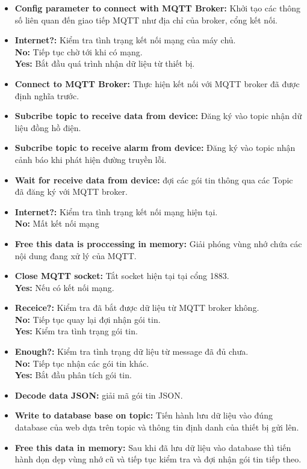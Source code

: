 \begin{itemize}
    \item \textbf{Config parameter to connect with MQTT Broker:} Khởi tạo các thông số liên quan đến giao tiếp MQTT như địa chỉ của broker, cổng kết nối.
    \item \textbf{Internet?:} Kiểm tra tình trạng kết nối mạng của máy chủ.\\
    \textbf{No:} Tiếp tục chờ tới khi có mạng.\\
    \textbf{Yes:} Bắt đầu quá trình nhận dữ liệu từ thiết bị.
    \item \textbf{Connect to MQTT Broker:} Thực hiện kết nối với MQTT broker đã được định nghĩa trước.
    \item \textbf{Subcribe topic to receive data from device:} Đăng ký vào topic nhận dữ liệu đồng hồ điện.
    \item \textbf{Subcribe topic to receive alarm from device:} Đăng ký vào topic nhận cảnh báo khi phát hiện đường truyền lỗi.
    \item \textbf{Wait for receive data from device:} đợi các gói tin thông qua các Topic đã đăng ký với MQTT broker.
    \item \textbf{Internet?:} Kiểm tra tình trạng kết nối mạng hiện tại.\\
    \textbf{No:} Mất kết nối mạng
    \item \textbf{Free this data is proccessing in memory:} Giải phóng vùng nhớ chứa các nội dung đang xử lý của MQTT.
    \item \textbf{Close MQTT socket:} Tắt socket hiện tại tại cổng 1883.\\
    \textbf{Yes:} Nếu có kết nối mạng.
    \item \textbf{Receice?:} Kiểm tra đã bắt được dữ liệu từ MQTT broker không.\\
    \textbf{No:} Tiếp tục quay lại đợi nhận gói tin.\\
    \textbf{Yes:} Kiểm tra tình trạng gói tin.
    \item \textbf{Enough?:} Kiểm tra tình trạng dữ liệu từ message đã đủ chưa.\\
    \textbf{No:} Tiếp tục nhận các gói tin khác.\\
    \textbf{Yes:} Bắt đầu phân tích gói tin.
    \item \textbf{Decode data JSON:} giải mã gói tin JSON.
    \item \textbf{Write to database base on topic:} Tiến hành lưu dữ liệu vào đúng database của web dựa trên topic và thông tin định danh của thiết bị gửi lên.
    \item \textbf{Free this data in memory:} Sau khi đã lưu dữ liệu vào database thì tiến hành dọn dẹp vùng nhớ cũ và tiếp tục kiểm tra và đợi nhận gói tin tiếp theo.
\end{itemize}
